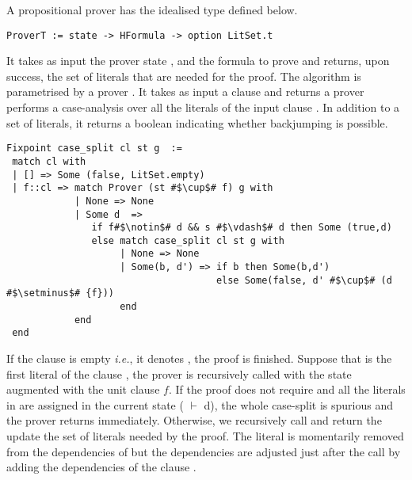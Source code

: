 \documentclass[utf8,a4paper,UKenglish,cleveref, autoref, thm-restate]{lipics-v2019}
\begin{document}
%
A propositional prover has the idealised type  defined below.
\begin{verbatim}
ProverT := state -> HFormula -> option LitSet.t
\end{verbatim}
It takes as input the prover state , and the formula
to prove  and returns, upon success, %
the set of literals that are needed for the proof.
%
The  algorithm is parametrised by a prover .
It takes as input a clause  and returns a prover performs a case-analysis over all the
literals of the input clause . In addition to a set of
literals, it returns a boolean indicating whether backjumping is
possible.
\begin{verbatim}
Fixpoint case_split cl st g  :=
 match cl with
 | [] => Some (false, LitSet.empty)
 | f::cl => match Prover (st #$\cup$# f) g with
            | None => None
            | Some d  =>
               if f#$\notin$# d && s #$\vdash$# d then Some (true,d)
               else match case_split cl st g with
                    | None => None
                    | Some(b, d') => if b then Some(b,d')
                                     else Some(false, d' #$\cup$# (d #$\setminus$# {f}))
                    end
            end
 end
\end{verbatim}
If the clause is empty \emph{i.e.}, it denotes , the proof
is finished.  Suppose that  is the first literal of the clause
, the prover is recursively called with the state 
augmented with the unit clause $f$. If the proof  does not
require  and all the literals in  are assigned in the current
state ( $\vdash$ d), the whole case-split is spurious and the
prover returns immediately.  Otherwise, we recursively call
 and return the update the set of literals needed by the proof.
%
The literal  is momentarily removed from the dependencies of
 but the dependencies are adjusted just after the
 call by adding the dependencies of the clause .
\end{document}
